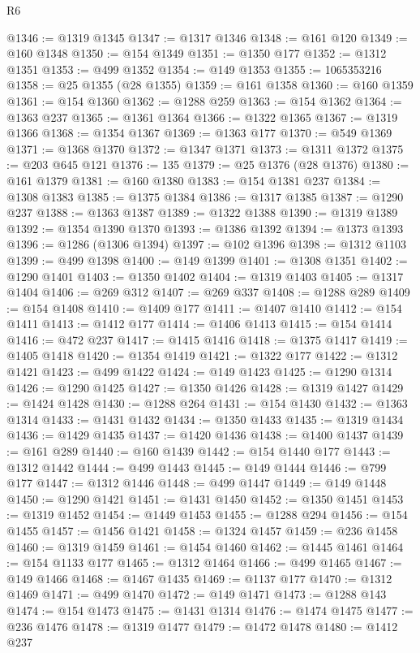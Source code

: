 \begin{lexlean}{R6}
\begin{coremodule}
@1346 := @1319 @1345
@1347 := @1317 @1346
@1348 := @161 @120
@1349 := @160 @1348
@1350 := @154 @1349
@1351 := @1350 @177
@1352 := @1312 @1351
@1353 := @499 @1352
@1354 := @149 @1353
@1355 := 1065353216
@1358 := @25 @1355 (@28 @1355)
@1359 := @161 @1358
@1360 := @160 @1359
@1361 := @154 @1360
@1362 := @1288 @259
@1363 := @154 @1362
@1364 := @1363 @237
@1365 := @1361 @1364
@1366 := @1322 @1365
@1367 := @1319 @1366
@1368 := @1354 @1367
@1369 := @1363 @177
@1370 := @549 @1369
@1371 := @1368 @1370
@1372 := @1347 @1371
@1373 := @1311 @1372
@1375 := @203 @645 @121
@1376 := 135
@1379 := @25 @1376 (@28 @1376)
@1380 := @161 @1379
@1381 := @160 @1380
@1383 := @154 @1381 @237
@1384 := @1308 @1383
@1385 := @1375 @1384
@1386 := @1317 @1385
@1387 := @1290 @237
@1388 := @1363 @1387
@1389 := @1322 @1388
@1390 := @1319 @1389
@1392 := @1354 @1390 @1370
@1393 := @1386 @1392
@1394 := @1373 @1393
@1396 := @1286 (@1306 @1394)
@1397 := @102 @1396
@1398 := @1312 @1103
@1399 := @499 @1398
@1400 := @149 @1399
@1401 := @1308 @1351
@1402 := @1290 @1401
@1403 := @1350 @1402
@1404 := @1319 @1403
@1405 := @1317 @1404
@1406 := @269 @312
@1407 := @269 @337
@1408 := @1288 @289
@1409 := @154 @1408
@1410 := @1409 @177
@1411 := @1407 @1410
@1412 := @154 @1411
@1413 := @1412 @177
@1414 := @1406 @1413
@1415 := @154 @1414
@1416 := @472 @237
@1417 := @1415 @1416
@1418 := @1375 @1417
@1419 := @1405 @1418
@1420 := @1354 @1419
@1421 := @1322 @177
@1422 := @1312 @1421
@1423 := @499 @1422
@1424 := @149 @1423
@1425 := @1290 @1314
@1426 := @1290 @1425
@1427 := @1350 @1426
@1428 := @1319 @1427
@1429 := @1424 @1428
@1430 := @1288 @264
@1431 := @154 @1430
@1432 := @1363 @1314
@1433 := @1431 @1432
@1434 := @1350 @1433
@1435 := @1319 @1434
@1436 := @1429 @1435
@1437 := @1420 @1436
@1438 := @1400 @1437
@1439 := @161 @289
@1440 := @160 @1439
@1442 := @154 @1440 @177
@1443 := @1312 @1442
@1444 := @499 @1443
@1445 := @149 @1444
@1446 := @799 @177
@1447 := @1312 @1446
@1448 := @499 @1447
@1449 := @149 @1448
@1450 := @1290 @1421
@1451 := @1431 @1450
@1452 := @1350 @1451
@1453 := @1319 @1452
@1454 := @1449 @1453
@1455 := @1288 @294
@1456 := @154 @1455
@1457 := @1456 @1421
@1458 := @1324 @1457
@1459 := @236 @1458
@1460 := @1319 @1459
@1461 := @1454 @1460
@1462 := @1445 @1461
@1464 := @154 @1133 @177
@1465 := @1312 @1464
@1466 := @499 @1465
@1467 := @149 @1466
@1468 := @1467 @1435
@1469 := @1137 @177
@1470 := @1312 @1469
@1471 := @499 @1470
@1472 := @149 @1471
@1473 := @1288 @143
@1474 := @154 @1473
@1475 := @1431 @1314
@1476 := @1474 @1475
@1477 := @236 @1476
@1478 := @1319 @1477
@1479 := @1472 @1478
@1480 := @1412 @237

\end{coremodule}
\end{lexlean}
